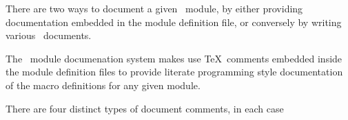
\startchapter[title=Documentation]

There are two ways to document a given \ConTeXt\ module, by either providing 
documentation embedded in the module definition file, or conversely by 
writing various \ConTeXt\ documents. 

\startsection[title=Internal documentation]

The \ConTeXt\ module documenation system makes use \TeX\ comments embedded 
inside the module definition files to provide literate programming style 
documentation of the macro definitions for any given module. 

There are four distinct types of document comments, in each case 

\startitemize

